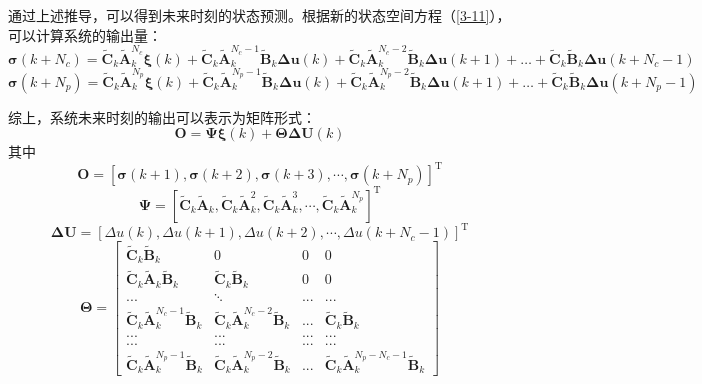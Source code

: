 \documentclass[lang=chs, degree=master, blindreview=false, winfonts=true]{yanputhesis}
\begin{document}
通过上述推导，可以得到未来时刻的状态预测。根据新的状态空间方程（\ref{3-11}），可以计算系统的输出量：
\begin{equation}
	\bm \sigma(k + N_c) = \tilde{\bm C}_k \tilde{\bm A}_k^{N_c} \bm \xi(k) + \tilde{\bm C}_k \tilde{\bm A}_k^{N_c-1} \tilde{\bm B}_k \bm \Delta \bm u(k) + \tilde{\bm C}_k \tilde{\bm A}_k^{N_c-2} \tilde{\bm B}_k \bm \Delta \bm u(k+1) + \dots + \tilde{\bm C}_k \tilde{\bm B}_k \bm \Delta \bm u(k + N_c - 1)
\end{equation}
\begin{equation}
	\bm  \sigma(k + N_p) = \tilde{\bm C}_k \tilde{\bm A}_k^{N_p}\bm  \xi(k) + \tilde{\bm C}_k \tilde{\bm A}_k^{N_p-1} \tilde{\bm B}_k \bm \Delta \bm u(k) + \tilde{\bm C}_k \tilde{\bm A}_k^{N_p-2} \tilde{\bm B}_k \bm \Delta \bm u(k+1) + \dots + \tilde{\bm C}_k \tilde{\bm B}_k \bm  \Delta \bm u(k + N_p - 1)
\end{equation}

综上，系统未来时刻的输出可以表示为矩阵形式：
\begin{equation}
    \bm O = \bm \Psi \bm \xi(k) + \bm \Theta \bm \Delta \bm U(k)
\end{equation}
其中$$
\boldsymbol{O} = 
\left[
	\boldsymbol{\sigma}(k+1) , \boldsymbol{\sigma}(k+2) , \boldsymbol{\sigma}(k+3) , \cdots , \boldsymbol{\sigma}(k+N_p)
\right]^\mathrm{T}$$
$$\boldsymbol{\Psi} = 
\left[
	\boldsymbol{\tilde{C}}_k\boldsymbol{\tilde{A}}_k , \boldsymbol{\tilde{C}}_k\boldsymbol{\tilde{A}}_k^2 , \boldsymbol{\tilde{C}}_k\boldsymbol{\tilde{A}}_k^3 , \cdots , \boldsymbol{\tilde{C}}_k\boldsymbol{\tilde{A}}_k^{N_p}
\right]^\mathrm{T}$$
$$\boldsymbol{\Delta U} = 
\left[
	\Delta u(k) , \Delta u(k+1) , \Delta u(k+2) , \cdots , \Delta u(k+N_c-1)
\right]^\mathrm{T}$$
$$\bm \Theta=\begin{bmatrix}\tilde{\bm C}_k\tilde{\bm B}_k&0&0&0\\\tilde{\bm C}_k\tilde{\bm A}_k\tilde{\bm B}_k&\tilde{\bm C}_k\tilde{\bm B}_k&0&0\\...&\ddots&...&...\\\tilde{\bm C}_k\tilde{\bm A}_k^{N_c-1}\tilde{\bm B}_k&\tilde{\bm C}_k\tilde{\bm A}_k^{N_c-2}\tilde{\bm B}_k&...&\tilde{\bm C}_k\tilde{\bm B}_k\\...&...&...&...\\...&...&...&...\\\tilde{\bm C}_k\tilde{\bm A}_k^{N_p-1}\tilde{\bm B}_k&\tilde{\bm C}_k\tilde{\bm A}_k^{N_p-2}\tilde{\bm B}_k&...&\tilde{\bm C}_k\tilde{\bm A}_k^{N_p-N_c-1}\tilde{\bm B}_k\end{bmatrix}$$
\end{document}
